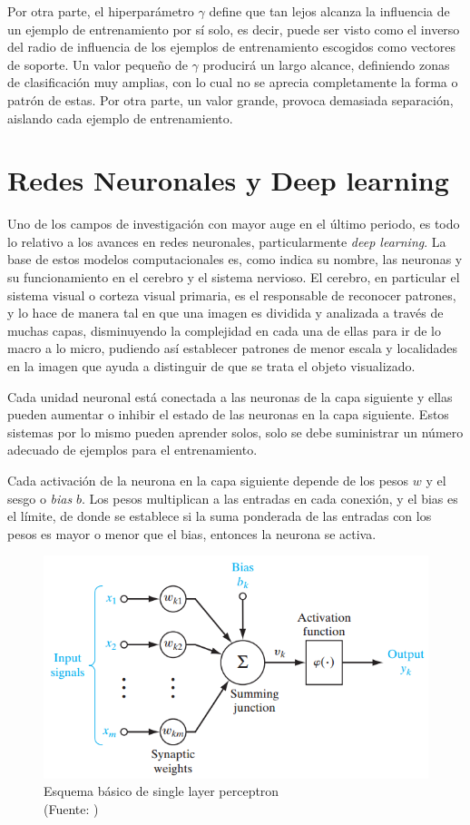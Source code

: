 Por otra parte, el hiperparámetro $\gamma$ define que tan lejos alcanza la influencia de un ejemplo de entrenamiento por sí solo, es decir, puede ser visto como el inverso del radio de influencia de los ejemplos de entrenamiento escogidos como vectores de soporte. Un valor pequeño de $\gamma$ producirá un largo alcance, definiendo zonas de clasificación muy amplias, con lo cual no se aprecia completamente la forma o patrón de estas. Por otra parte, un valor grande, provoca demasiada separación, aislando cada ejemplo de entrenamiento.

\section{Redes Neuronales y Deep learning}

Uno de los campos de investigación con mayor auge en el último periodo, es todo lo relativo a los avances en redes neuronales, particularmente \textit{deep learning}.  La base de estos modelos computacionales es, como indica su nombre, las neuronas y su funcionamiento en el cerebro y el sistema nervioso. El cerebro, en particular el sistema visual o corteza visual primaria, es el responsable de reconocer patrones, y lo hace de manera tal en que una imagen es dividida y analizada a través de muchas capas, disminuyendo la complejidad en cada una de ellas para ir de lo macro a lo micro, pudiendo así establecer patrones de menor escala y localidades en la imagen que ayuda a distinguir de que se trata el objeto visualizado.

Cada unidad neuronal está conectada a las neuronas de la capa siguiente y ellas pueden aumentar o inhibir el estado de las neuronas en la capa siguiente. Estos sistemas por lo mismo pueden aprender solos, solo se debe suministrar un número adecuado de ejemplos para el entrenamiento.

Cada activación de la neurona en la capa siguiente depende de los pesos $w$ y el sesgo o \textit{bias} $b$. Los pesos multiplican a las entradas en cada conexión, y el bias es el límite, de donde se establece si la suma ponderada de las entradas con los pesos es mayor o menor que el bias, entonces la neurona se activa.

\begin{figure}[ht!]
\centering
\includegraphics[width=.6\textwidth]{figures/SLP.png}
\caption[Esquema básico de single layer perceptron]{Esquema básico de single layer perceptron\\
{\scriptsize (Fuente: \cite{slp})}}
\label{fig:slp}
\end{figure}

